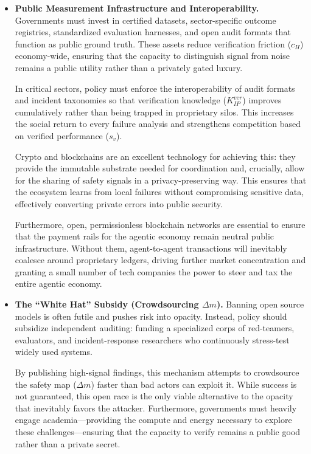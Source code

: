 \documentclass[12pt, letter]{article}
\begin{document}
\begin{itemize}
    \item \textbf{Public Measurement Infrastructure and Interoperability.} Governments must invest in certified datasets, sector-specific outcome registries, standardized evaluation harnesses, and open audit formats that function as public ground truth. These assets reduce verification friction ($c_H$) economy-wide, ensuring that the capacity to distinguish signal from noise remains a public utility rather than a privately gated luxury.
    
    In critical sectors, policy must enforce the interoperability of audit formats and incident taxonomies so that verification knowledge ($K_{IP}^{ver}$) improves cumulatively rather than being trapped in proprietary silos. This increases the social return to every failure analysis and strengthens competition based on verified performance ($s_v$).
    
    Crypto and blockchains are an excellent technology for achieving this: they provide the immutable substrate needed for coordination and, crucially, allow for the sharing of safety signals in a privacy-preserving way. This ensures that the ecosystem learns from local failures without compromising sensitive data, effectively converting private errors into public security.

    Furthermore, open, permissionless blockchain networks are essential to ensure that the payment rails for the agentic economy remain neutral public infrastructure. Without them, agent-to-agent transactions will inevitably coalesce around proprietary ledgers, driving further market concentration and granting a small number of tech companies the power to steer and tax the entire agentic economy.

    \item \textbf{The ``White Hat'' Subsidy (Crowdsourcing $\Delta m$).} Banning open source models is often futile and pushes risk into opacity. Instead, policy should subsidize independent auditing: funding a specialized corps of red-teamers, evaluators, and incident-response researchers who continuously stress-test widely used systems.

    By publishing high-signal findings, this mechanism attempts to crowdsource the safety map ($\Delta m$) faster than bad actors can exploit it. While success is not guaranteed, this open race is the only viable alternative to the opacity that inevitably favors the attacker. Furthermore, governments must heavily engage academia—providing the compute and energy necessary to explore these challenges—ensuring that the capacity to verify remains a public good rather than a private secret.


\end{itemize}
\end{document}

